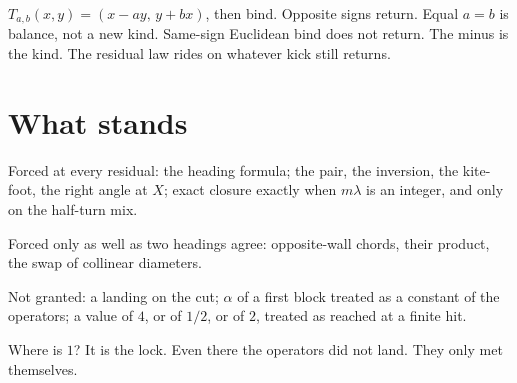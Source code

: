 \documentclass[10pt,a4paper]{article}
\theoremstyle{plain}
\theoremstyle{definition}
\theoremstyle{remark}
\begin{document}
\(T_{a,b}(x,y)=(x-ay,\,y+bx)\), then bind.
Opposite signs return.
Equal \(a=b\) is balance, not a new kind.
Same-sign Euclidean bind does not return.
The minus is the kind.
The residual law rides on whatever kick still returns.

\section{What stands}

Forced at every residual:
the heading formula;
the pair, the inversion, the kite-foot, the right angle at \(X\);
exact closure exactly when \(m\lambda\) is an integer, and only on the half-turn mix.

Forced only as well as two headings agree:
opposite-wall chords, their product, the swap of collinear diameters.

Not granted:
a landing on the cut;
\(\alpha\) of a first block treated as a constant of the operators;
a value of \(4\), or of \(1/2\), or of \(2\), treated as reached at a finite hit.

Where is \(1\)?
It is the lock.
Even there the operators did not land.
They only met themselves.
\end{document}
